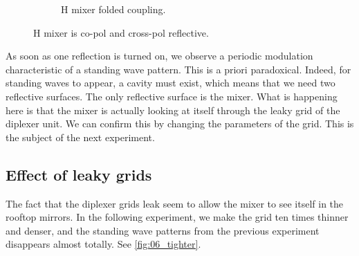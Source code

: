 \begin{figure}[hbtp]
\begin{subfigure}[b]{.5\textwidth}
        \caption{H mixer folded coupling.}
    \end{subfigure}%
    \caption{H mixer is co-pol and cross-pol reflective.}
    \label{fig:05_mh_cocr}
\end{figure}

As soon as one reflection is turned on, we observe a periodic modulation characteristic of a standing wave pattern.
This is a priori paradoxical.
Indeed, for standing waves to appear, a cavity must exist, which means that we need two reflective surfaces.
The only reflective surface is the mixer.
What is happening here is that the mixer is actually looking at itself through the leaky grid of the diplexer unit.
We can confirm this by changing the parameters of the grid.
This is the subject of the next experiment.

\clearpage
\subsection{Effect of leaky grids}
The fact that the diplexer grids leak seem to allow the mixer to see itself in the rooftop mirrors.
In the following experiment, we make the grid ten times thinner and denser, and the standing wave patterns from the previous experiment disappears almost totally.
See \cref{fig:06_tighter}.

